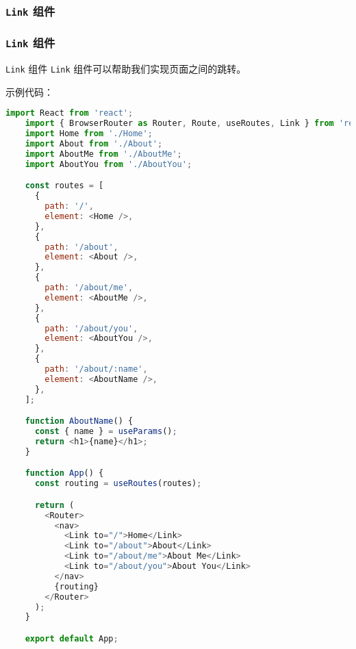 \documentclass{beamer}
\begin{document}
\subsubsection{\texttt{Link} 组件}

\begin{frame}
  \frametitle{\texttt{Link} 组件}

  \begin{block}{\texttt{Link} 组件}
    \texttt{Link} 组件可以帮助我们实现页面之间的跳转。
  \end{block}

  示例代码：

  \begin{lstlisting}[language=JavaScript]
    import React from 'react';
    import { BrowserRouter as Router, Route, useRoutes, Link } from 'react-router-dom';
    import Home from './Home';
    import About from './About';
    import AboutMe from './AboutMe';
    import AboutYou from './AboutYou';

    const routes = [
      {
        path: '/',
        element: <Home />,
      },
      {
        path: '/about',
        element: <About />,
      },
      {
        path: '/about/me',
        element: <AboutMe />,
      },
      {
        path: '/about/you',
        element: <AboutYou />,
      },
      {
        path: '/about/:name',
        element: <AboutName />,
      },
    ];

    function AboutName() {
      const { name } = useParams();
      return <h1>{name}</h1>;
    }

    function App() {
      const routing = useRoutes(routes);

      return (
        <Router>
          <nav>
            <Link to="/">Home</Link>
            <Link to="/about">About</Link>
            <Link to="/about/me">About Me</Link>
            <Link to="/about/you">About You</Link>
          </nav>
          {routing}
        </Router>
      );
    }

    export default App;
  \end{lstlisting}

\end{frame}
\end{document}
